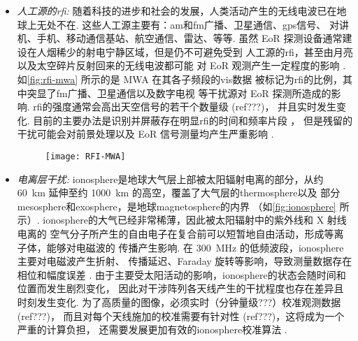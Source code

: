 \begin{itemize}
\item
\emph{人工源的\acl{rfi}:}
随着科技的进步和社会的发展，人类活动产生的无线电波已在地球上无处不在.
这些人工源主要有：\ac{am}和\ac{fm}广播、卫星通信、\ac{gps}信号、
对讲机、手机、移动通信基站、航空通信、雷达、等等.
虽然 EoR 探测设备通常建设在人烟稀少的射电宁静区域，但是仍不可避免受到
人工源的\acl{rfi}，甚至由月亮以及太空碎片反射回来的无线电波都可能
对 EoR 观测产生一定程度的影响 \cite{mckinley2013,tingay2013rfi}.
如\autoref{fig:rfi-mwa} 所示的是 MWA 在其各子频段的\acl{vis}数据
被标记为\acl{rfi}的比例，其中突显了\ac{fm}广播、卫星通信以及数字电视
等干扰源对 EoR 探测所造成的影响.
\acl{rfi}的强度通常会高出天空信号的若干个数量级 \cite{bentum2011} (ref???)，
并且实时发生变化.
目前的主要办法是识别并屏蔽存在明显\acl{rfi}的时间和频率片段
\cite{offringa2010,offringa2012,prasad2012}，
但是残留的干扰可能会对前景处理以及 EoR 信号测量均产生严重影响 \cite{offringa2015}.

\begin{figure}[tbp]
  \centering
  \texttt{[image: RFI-MWA]}
  \label{fig:rfi-mwa}
\end{figure}

\item
\emph{电离层干扰:}
\ac{ionosphere}是地球大气层上部被太阳辐射电离的部分，从约 \SI{60}{\km}
延伸至约 \SI{1000}{\km} 的高空，覆盖了大气层的\ac{thermosphere}以及
部分\ac{mesosphere}和\ac{exosphere}，是地球\ac{magnetosphere}的内界
（如\autoref{fig:ionosphere} 所示）.
\acl{ionosphere}的大气已经非常稀薄，因此被太阳辐射中的紫外线和 X 射线电离的
空气分子所产生的自由电子在复合前可以短暂地自由活动，形成等离子体，能够对电磁波的
传播产生影响.
在 \SI{300}{\MHz} 的低频波段，\acl{ionosphere}主要对电磁波产生折射、
传播延迟、Faraday 旋转等影响，导致测量数据存在相位和幅度误差
\cite{intema2009,thompson2017}.
由于主要受太阳活动的影响，\acl{ionosphere}的状态会随时间和位置而发生剧烈变化，
因此对干涉阵列各天线产生的干扰程度也存在差异且时刻发生变化.
为了高质量的图像，必须实时（分钟量级???）校准观测数据 (ref???)，
而且对每个天线施加的校准需要有针对性 (ref???)，这将成为一个严重的计算负担，
还需要发展更加有效的\acl{ionosphere}校准算法 \cite{intema2009,deGasperin2018}.


\end{itemize}
